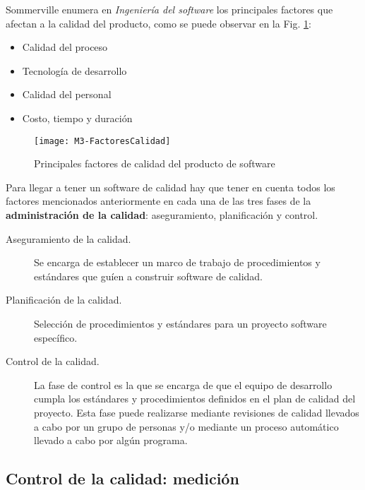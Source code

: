Sommerville enumera en \textit{Ingeniería del software} \cite{sommerville_ingenierisoftware_2002} los principales factores que afectan a la calidad del producto, como se puede observar en la Fig. \ref{fig:M3-FactoresCalidad}:
\begin{itemize}
	\tightlist
	\item Calidad del proceso
	\item Tecnología de desarrollo
	\item Calidad del personal
	\item Costo, tiempo y duración
\end{itemize}
\begin{figure}[!h]
	\centering
	\texttt{[image: M3-FactoresCalidad]}
	\caption{Principales factores de calidad del producto de software \cite{sommerville_ingenierisoftware_2002}}\label{fig:M3-FactoresCalidad}
\end{figure}
\FloatBarrier


Para llegar a tener un software de calidad hay que tener en cuenta todos los factores mencionados anteriormente en cada una de las tres fases de la \textbf{administración de la calidad}: aseguramiento, planificación y control.

\begin{description}
	\item[Aseguramiento de la calidad.] Se encarga de establecer un marco de trabajo de procedimientos y estándares que guíen a construir software de calidad.
	\item[Planificación de la calidad.] Selección de procedimientos y estándares para un proyecto software específico.
	\item[Control de la calidad.] La fase de control es la que se encarga de que el equipo de desarrollo cumpla los estándares y procedimientos definidos en el plan de calidad del proyecto. Esta fase puede realizarse mediante revisiones de calidad llevados a cabo por un grupo de personas y/o mediante un proceso automático llevado a cabo por algún programa.
\end{description}


\subsection{Control de la calidad: medición}

